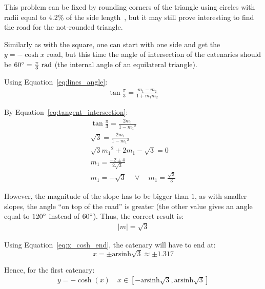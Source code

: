 \documentclass[12pt]{article}
\begin{document}
        This problem can be fixed by rounding corners of the triangle using circles with radii equal to $4.2\%$ of the side length~\cite{Hall_Wagon_1992,bridge_wolfram}, but it may still prove interesting to find the road for the not-rounded triangle.

        Similarly as with the square, one can start with one side and get the $y= -\cosh x$ road, but this time the angle of intersection of the catenaries should be $60\degree = \frac{\pi}{3} \;\text{rad}$ (the internal angle of an equilateral triangle).

        Using Equation~\ref{eq:lines_angle}:
        \begin{align}
            \tan \frac{\pi}{3} = \frac{m_1 - m_2}{1 + m_1 m_2}
        \end{align}

        By Equation~\ref{eq:tangent_intersection}:
        \begin{align}
            \tan \frac{\pi}{3} = \frac{2 m_1}{1 - {m_1}^2} \\
            \sqrt{3} = \frac{2 m_1}{1 - {m_1}^2} \\
            \sqrt{3} {m_1}^2 + 2 m_1 - \sqrt{3} = 0 \\
            m_1 = \frac{-2 \pm 4}{2 \sqrt{3}} \\
            m_1 = - \sqrt{3} \quad \lor \quad m_1 = \frac{\sqrt{3}}{3}
        \end{align}

        However, the magnitude of the slope has to be bigger than $1$, as with smaller slopes, the angle ``on top of the road'' is greater (the other value gives an angle equal to $120\degree$ instead of $60\degree$). Thus, the correct result is:
        \begin{align*}
            |m| = \sqrt{3}
        \end{align*}

        Using Equation~\ref{eq:x_cosh_end}, the catenary will have to end at:
        \begin{equation}
            x = \pm \text{arsinh}\sqrt{3} \approx \pm 1.317
        \end{equation}

        Hence, for the first catenary:
        \begin{align}
            y = -\cosh(x) \quad x \in [-\text{arsinh}\sqrt{3}, \text{arsinh}\sqrt{3}]
        \end{align}
\end{document}

